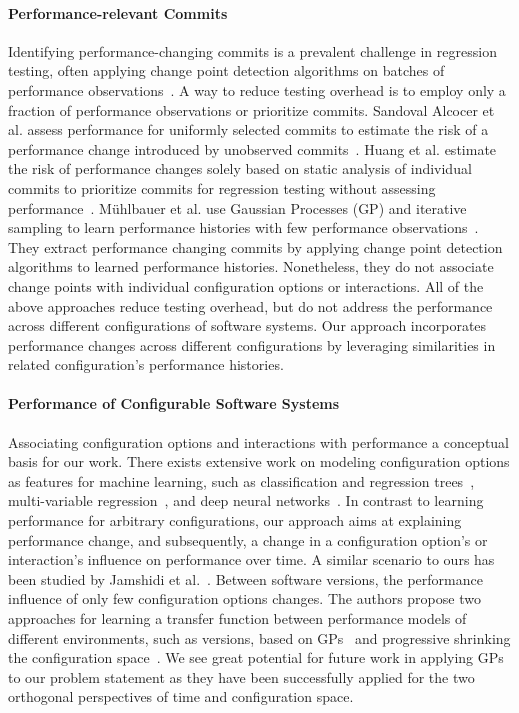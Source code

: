 \documentclass[sigconf]{acmart}
\begin{document}
	\paragraph{Performance-relevant Commits} Identifying performance-changing commits is a prevalent challenge in regression testing, often applying change point detection algorithms on batches of performance observations~\cite{cityIdentifying2014,daly_industry_2020}. A way to reduce testing overhead is to employ only a fraction of performance observations or prioritize commits. Sandoval Alcocer et al. assess performance for uniformly selected commits to estimate the risk of a performance change introduced by unobserved commits~\cite{sandoval_alcocer_learning_2016,alcocer_prioritizing_2020}. Huang et al. estimate the risk of performance changes solely based on static analysis of individual commits to prioritize commits for regression testing without assessing performance~\cite{huang_performance_2014}. Mühlbauer et al. use Gaussian Processes (GP) and iterative sampling to learn performance histories with few performance observations~\cite{muhlbauer_accurate_2019}. They extract performance changing commits by applying change point detection algorithms to learned performance histories. {\color{red}Nonetheless, they do not associate change points with individual configuration options or interactions.} All of the above approaches reduce testing overhead, but do not address the performance across different configurations of software systems. Our approach incorporates performance changes across different configurations by leveraging similarities in related configuration's performance histories.
	\paragraph{Performance of Configurable Software Systems} Associating configuration options and interactions with performance a conceptual basis for our work. There exists extensive work on modeling configuration options as features for machine learning, such as classification and regression trees~\cite{guoVariabilityawarePerformancePrediction2013,sarkarCostEfficientSamplingPerformance,nairUsingBadLearners2017}, multi-variable regression~\cite{siegmundPerformanceinfluenceModelsHighly2015}, and deep neural networks~\cite{haDeepPerf2019}. In contrast to learning performance for arbitrary configurations, our approach aims at explaining performance change, and subsequently, a change in a configuration option's or interaction's influence on performance over time. A similar scenario to ours has been studied by Jamshidi et al.~\cite{jamishidi_transfer_2017,jamshidi_transfer_gp_2017,jamshidi_learning_2018}. Between software versions, the performance influence of only few configuration options changes. The authors propose two approaches for learning a transfer function between performance models of different environments, such as versions, based on GPs~\cite{jamshidi_transfer_gp_2017} and progressive shrinking the configuration space~\cite{jamshidi_learning_2018}. We see great potential for future work in applying GPs to our problem statement as they have been successfully applied for the two orthogonal perspectives of time and configuration space.
	
\end{document}
